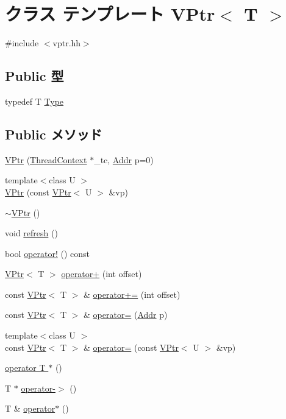 \hypertarget{classVPtr}{
\section{クラス テンプレート VPtr$<$ T $>$}
\label{classVPtr}
}


{\ttfamily \#include $<$vptr.hh$>$}\subsection*{Public 型}
\begin{DoxyCompactItemize}
\item 
typedef T \hyperlink{classVPtr_a685b7a70f0ae1f2881cf8937d951c3b1}{Type}
\end{DoxyCompactItemize}
\subsection*{Public メソッド}
\begin{DoxyCompactItemize}
\item 
\hyperlink{classVPtr_a186059eb660226fff747f93fd32093c3}{VPtr} (\hyperlink{classThreadContext}{ThreadContext} $\ast$\_\-tc, \hyperlink{base_2types_8hh_af1bb03d6a4ee096394a6749f0a169232}{Addr} p=0)
\item 
{\footnotesize template$<$class U $>$ }\\\hyperlink{classVPtr_a4f0a913709c195b41591d6d624435663}{VPtr} (const \hyperlink{classVPtr}{VPtr}$<$ U $>$ \&vp)
\item 
\hyperlink{classVPtr_a01c82e4197153328212e92ba561e5a4a}{$\sim$VPtr} ()
\item 
void \hyperlink{classVPtr_a5f2e190b8261a98c97c2ea4e86670d54}{refresh} ()
\item 
bool \hyperlink{classVPtr_ac8b1d32dbd52d431450c70b151cfa205}{operator!} () const 
\item 
\hyperlink{classVPtr}{VPtr}$<$ T $>$ \hyperlink{classVPtr_aa79204a51e8317fe052ddb1f99adfd90}{operator+} (int offset)
\item 
const \hyperlink{classVPtr}{VPtr}$<$ T $>$ \& \hyperlink{classVPtr_aebd3c885be33c9d591dc07ba526d12bf}{operator+=} (int offset)
\item 
const \hyperlink{classVPtr}{VPtr}$<$ T $>$ \& \hyperlink{classVPtr_a5d3116f4217a75c4bc6b499dbf50ea6e}{operator=} (\hyperlink{base_2types_8hh_af1bb03d6a4ee096394a6749f0a169232}{Addr} p)
\item 
{\footnotesize template$<$class U $>$ }\\const \hyperlink{classVPtr}{VPtr}$<$ T $>$ \& \hyperlink{classVPtr_a89bf8629365349f439c0a899d0080a3b}{operator=} (const \hyperlink{classVPtr}{VPtr}$<$ U $>$ \&vp)
\item 
\hyperlink{classVPtr_a4e20322854ce5d78776cdaf1a87aacd9}{operator T $\ast$} ()
\item 
T $\ast$ \hyperlink{classVPtr_af6e485beee07fd401de29c8cdf898c69}{operator-\/$>$} ()
\item 
T \& \hyperlink{classVPtr_af7f8c6b921dca2b94f6e7ee14e762770}{operator$\ast$} ()
\end{DoxyCompactItemize}
